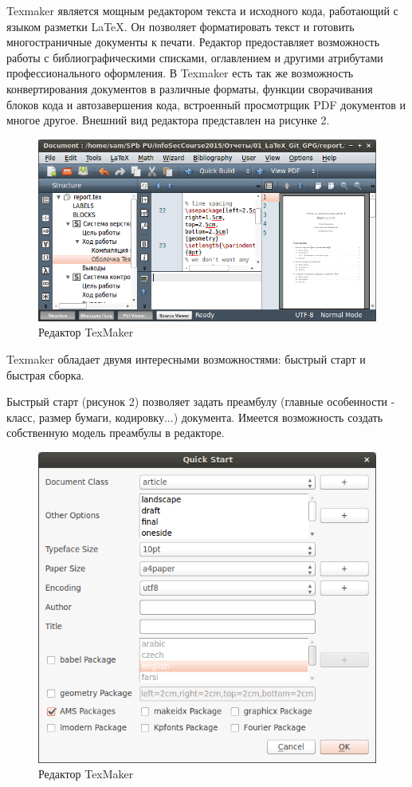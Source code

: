 \documentclass[a4paper, 12pt]{article}		%
\begin{document}
Texmaker является мощным редактором текста и исходного кода, работающий с языком разметки LaTeX. Он позволяет форматировать текст и готовить многостраничные документы к печати. Редактор предоставляет возможность работы с библиографическими списками, оглавлением и другими атрибутами профессионального оформления. В Texmaker есть так же возможность конвертирования документов в различные форматы, функции сворачивания блоков кода и автозавершения кода, встроенный просмотрщик PDF документов и многое другое. Внешний вид редактора представлен на рисунке 2.

\begin{figure}[h!]
\centering
\includegraphics[scale=0.65]{res/TexMaker}
\caption{Редактор TexMaker}
\end{figure}

Texmaker обладает двумя интересными возможностями: быстрый старт и быстрая сборка.

Быстрый старт (рисунок 2) позволяет задать преамбулу (главные особенности - класс, размер бумаги, кодировку...) документа. Имеется возможность создать собственную модель преамбулы в редакторе.

\begin{figure}[h!]
\centering
\includegraphics[scale=0.65]{res/QuickStart}
\caption{Редактор TexMaker}
\end{figure}
\end{document}
